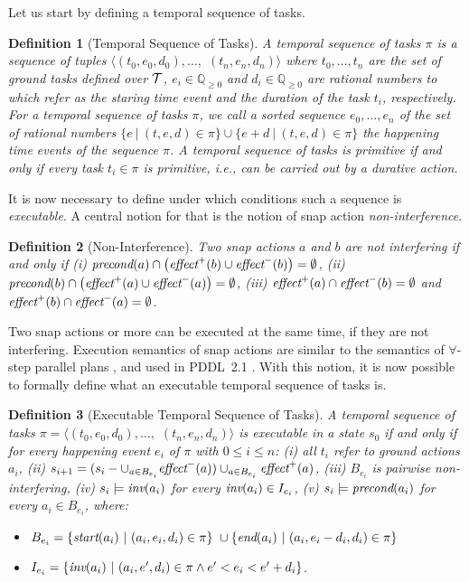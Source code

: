 \documentclass[letterpaper]{article} %
\newtheorem{definition}{Definition}
\newcommand{\pre}{\text{\it precond}}
\newcommand{\add}{\text{\it effect}^{+}}
\newcommand{\del}{\text{\it effect}^{-}}
\newcommand{\tstart}{\text{\it start}}
\newcommand{\tend}{\text{\it end}}
\newcommand{\tinv}{\text{\it inv}}
\begin{document}
Let us start by defining a temporal sequence of tasks.
\begin{definition}[Temporal Sequence of Tasks]
A {\it temporal sequence of tasks} $\pi$ is a sequence of tuples $\langle (t_0, e_0, d_0), \ldots,$ $(t_n, e_n, d_n) \rangle$ where $t_0, \ldots, t_n$ are the set of ground tasks defined over $\cal{T}$, $e_i \in \mathbb{Q}_{\geq 0}$ and $d_i \in \mathbb{Q}_{\geq 0}$ are rational numbers to which refer as the staring time event and the duration of the task $t_i$, respectively. For a temporal sequence of tasks $\pi$, we call a sorted sequence $e_0, \ldots, e_n$ of the set of rational numbers $\{e \ | \ (t, e, d) \in \pi\} \cup \{e + d \ | \ (t, e, d) \in \pi\}$ the happening time events of the sequence $\pi$. %
A temporal sequence of tasks is primitive if and only if every task $t_i \in \pi$ is primitive, i.e., can be carried out by a durative action.
\end{definition}

It is now necessary to define under which conditions such a sequence is {\it executable}. A central notion for that is the notion of snap action {\it non-interference}.
\begin{definition}[Non-Interference]
Two snap actions $a$ and $b$ are not interfering if and only if (i) $\pre(a) \cap \bigl(\add(b) \cup \del(b)\bigr) = \emptyset$, (ii) $\pre(b) \cap \bigl(\add(a) \cup \del(a)\bigr) = \emptyset$, (iii) $\add(a) \cap \del(b) = \emptyset$ and  $\add(b) \cap \del(a) = \emptyset$.
\end{definition}
Two snap actions or more can be executed at the same time, if they are not interfering. Execution semantics of snap actions are similar to the semantics of $\forall$-step parallel plans \cite{rintanen06}, and used in PDDL~2.1 \cite{fox03}. With this notion, it is now possible to formally define what an executable temporal sequence of tasks is.

\begin{definition}[Executable Temporal Sequence of Tasks]
A temporal sequence of tasks $\pi = \langle (t_0, e_0, d_0), \ldots,$ $(t_n, e_n, d_n) \rangle$ is executable in a state $s_0$ if and only if for every happening event $e_i$ of $\pi$ with $0 \leq i \leq n$:
(i) all $t_i$ refer to ground actions $a_i$,
(ii) $s_{i+1} = (s_i - \cup_{a \in B_{e_i}} \del(a)) \cup_{a \in B_{e_i}} \add(a)$,
(iii) $B_{e_i}$ is {\em pairwise non-interfering},
(iv) $s_i \models \tinv(a_i)$ for every $\tinv(a_i) \in I_{e_i}$, (v) $s_i \models \pre(a_i)$ for every $a_i \in B_{e_i}$, where:
\begin{itemize}
 \item $B_{e_i} = \{ \tstart(a_i) \ | \ (a_i, e_i, d_i) \in \pi\} \ \cup  \{\tend(a_i) \ | \ (a_i, e_i - d_i, d_i) \in \pi\}$
 \item $I_{e_i} = \{ \tinv(a_i) \ | \ (a_i,e',d_i) \in \pi \wedge e' < e_i < e' + d_i\}$.
 \end{itemize}

 \end{definition}
\end{document}
